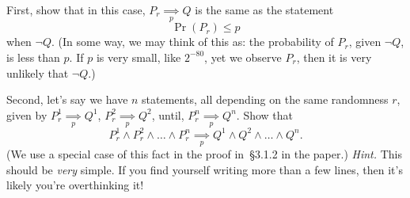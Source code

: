 \documentclass[12pt,hidelinks]{article}
\newcommand{\impliesn}[1]{\underset{#1}{\implies}}
\newcommand{\impliesp}{\impliesn{p}}
\begin{document}
First, show that in this case, $P_r \impliesp Q$ is the same as the statement
\[
    \Pr(P_r) \le p
\]
when $\neg Q$. (In some way, we may think of this as: the probability of $P_r$,
given $\neg Q$, is less than $p$. If $p$ is very small, like $2^{-80}$, yet we
observe $P_r$, then it is very unlikely that $\neg Q$.)

Second, let's say we have $n$ statements, all depending on the same randomness
$r$, given by $P_r^1 \impliesp Q^1$, $P_r^2 \impliesp Q^2$, until, $P_r^n
\impliesp Q^n$. Show that
\[
    P_r^1 \wedge P_r^2 \wedge \dots \wedge P_r^n \impliesp Q^1 \wedge Q^2 \wedge \dots \wedge Q^n.
\]
(We use a special case of this fact in the proof in~\S3.1.2 in the paper.)
\emph{Hint.} This should be \emph{very} simple. If you find yourself writing more
than a few lines, then it's likely you're overthinking it!
\end{document}
